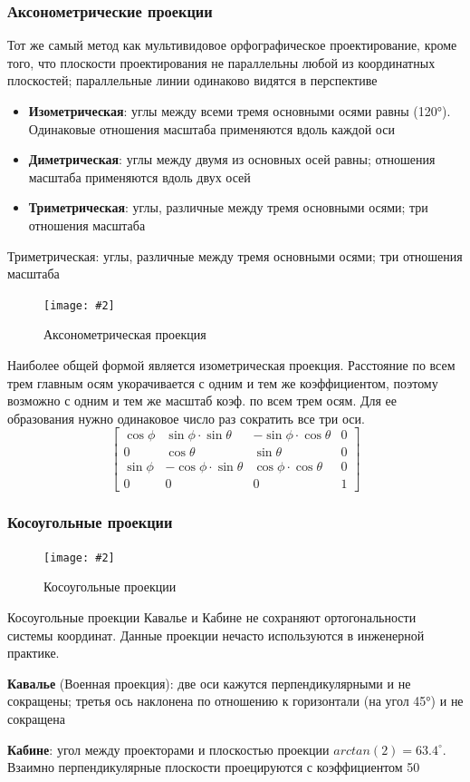 \documentclass[a4paper, 14pt]{extarticle}
\newcommand{\screenshot}[3]{
	\begin{figure}[h]
		\centering
		\texttt{[image: \#2]}
		\caption{#3}
	\end{figure}
}
\begin{document}
\subsubsection{Аксонометрические проекции}
Тот же самый метод как мультивидовое орфографическое проектирование, кроме того, что плоскости проектирования не параллельны любой из координатных плоскостей; параллельные линии одинаково видятся в перспективе
\begin{itemize}
	\item \textbf{Изометрическая}: углы между всеми тремя основными осями равны (120°). Одинаковые отношения масштаба применяются вдоль каждой оси
	\item \textbf{Диметрическая}: углы между двумя из основных осей равны; отношения масштаба применяются вдоль двух осей
	\item \textbf{Триметрическая}: углы, различные между тремя основными осями; три отношения масштаба
\end{itemize}
Триметрическая: углы, различные между тремя основными осями; три отношения масштаба
\screenshot{width=9cm}{l5/S039.jpg}{Аксонометрическая проекция}
Наиболее общей формой является изометрическая проекция. Расстояние по всем трем главным осям укорачивается с одним и тем же коэффициентом, поэтому возможно с одним и тем же масштаб коэф. по всем трем осям. Для ее образования нужно одинаковое число раз сократить все три оси.
$$
\begin{bmatrix}
\cos{\phi} & \sin{\phi} \cdot \sin{\theta} & -\sin{\phi} \cdot \cos{\theta} & 0 \\
0 & \cos{\theta} & \sin{\theta} & 0\\
\sin{\phi} & -\cos{\phi} \cdot \sin{\theta} & \cos{\phi} \cdot \cos{\theta} & 0\\
0 & 0 & 0 & 1
\end{bmatrix}
$$

\subsubsection{Косоугольные проекции}
\screenshot{width=9cm}{l5/S040.jpg}{Косоугольные проекции}
Косоугольные проекции Кавалье и Кабине не сохраняют ортогональности системы координат. Данные проекции нечасто используются в инженерной практике.

\textbf{Кавалье} (Военная проекция): две оси кажутся перпендикулярными и не сокращены; третья ось наклонена по отношению к горизонтали (на угол 45°) и не сокращена

\textbf{Кабине}: угол между проекторами и плоскостью проекции $arctan(2)=63.4^\circ$. Взаимно перпендикулярные плоскости 	проецируются с коэффициентом 50%
\end{document}
